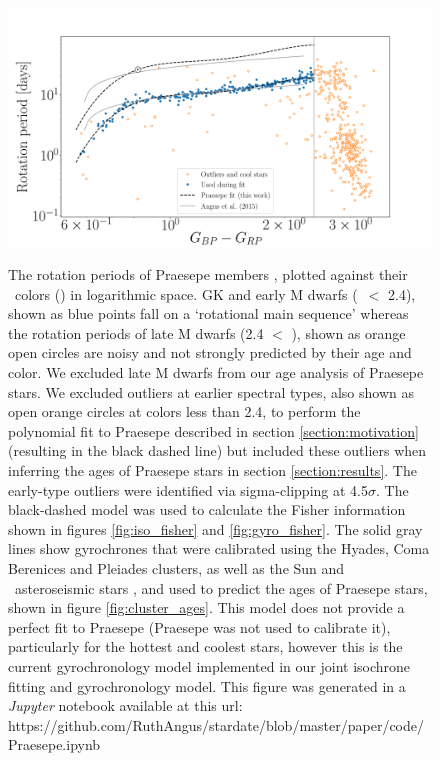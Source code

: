 \begin{figure}
  \caption{
    The rotation periods of Praesepe members \citep{douglas2016}, plotted
    against their \Gaia\ colors (\gcolor) in logarithmic space.
    GK and early M dwarfs (\gcolor\ $<$ 2.4), shown as blue points fall on a
    `rotational main sequence' whereas the rotation periods of late M dwarfs
    (2.4 $<$ \gcolor), shown as orange open circles
    are noisy and not strongly predicted by their age and color.
    We excluded late M dwarfs from our age analysis of Praesepe stars.
    We excluded outliers at earlier spectral types, also shown as open orange
    circles at colors less than 2.4, to perform the polynomial fit to Praesepe
    described in section \ref{section:motivation} (resulting in the black
    dashed line) but included these outliers when inferring the ages of
    Praesepe stars in section \ref{section:results}.
    The early-type outliers were identified via sigma-clipping at
    4.5$\sigma$.
    The black-dashed model was used to calculate the Fisher information shown
    in figures \ref{fig:iso_fisher} and \ref{fig:gyro_fisher}.
    The solid gray lines show gyrochrones that were calibrated using the
    Hyades, Coma Berenices and Pleiades clusters, as well as the Sun and
    \kepler\ asteroseismic stars \citep{angus2015}, and used to predict the
    ages of Praesepe stars, shown in figure \ref{fig:cluster_ages}.
    This model does not provide a perfect fit to Praesepe (Praesepe was not
    used to calibrate it),
    particularly for the hottest and coolest stars,
    however this is the current gyrochronology model implemented in our joint
    isochrone fitting and gyrochronology model.
    This figure was generated in a {\it Jupyter} notebook available at this
    url:
https://github.com/RuthAngus/stardate/blob/master/paper/code/Praesepe.ipynb
}
  \centering
    \includegraphics[width=1\textwidth]{with_angus_gyrochrones.pdf}
\label{fig:praesepe}
\end{figure}

